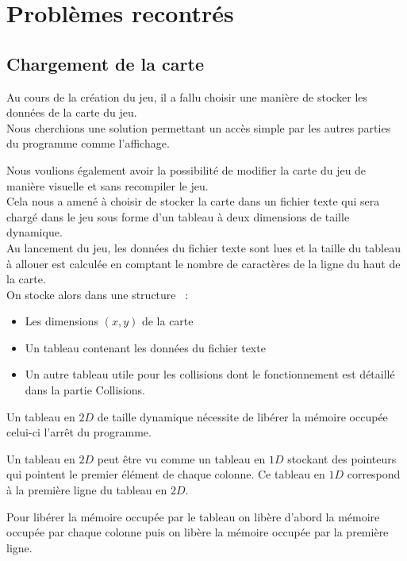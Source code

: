 \documentclass[12pt]{article}
\begin{document}
	\section{Problèmes recontrés}

		\subsection{Chargement de la carte}
		
			Au cours de la création du jeu, il a fallu choisir une manière de stocker les données de la carte du jeu.\\


			Nous cherchions une solution permettant un accès simple par les autres parties du programme comme l’affichage.
		
			Nous voulions également avoir la possibilité de modifier la carte du jeu de manière visuelle et sans recompiler le jeu.\\


			Cela nous a amené à choisir de stocker la carte dans un fichier texte qui sera chargé dans le jeu sous forme 
			d’un tableau à deux dimensions de taille dynamique.\\
		
			Au lancement du jeu, les données du fichier texte sont lues et la taille du tableau à allouer est calculée en 
			comptant le nombre de caractères de la ligne du haut de la carte.\\
		
			On stocke alors dans une structure  :
			\begin{itemize}
				\item Les dimensions \((x, y)\) de la carte
				\item Un tableau contenant les données du fichier texte
				\item Un autre tableau utile pour les collisions dont le fonctionnement est détaillé dans la partie Collisions.
			\end{itemize}
		
			Un tableau en \(2D\) de taille dynamique nécessite de libérer la mémoire occupée celui-ci l’arrêt du programme.
		
			Un tableau en \(2D\) peut être vu comme un tableau en \(1D\) stockant des pointeurs qui pointent le premier élément 
			de chaque colonne. Ce tableau en \(1D\) correspond à la première ligne du tableau en \(2D\).
		
			Pour libérer la mémoire occupée par le tableau on libère d’abord la mémoire occupée par chaque colonne puis 
			on libère la mémoire occupée par la première ligne.
		
\end{document}
